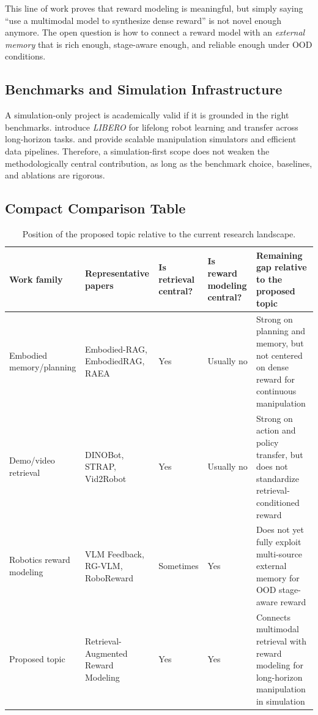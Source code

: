 This line of work proves that reward modeling is meaningful,
but simply saying ``use a multimodal model to synthesize dense reward'' is not novel enough anymore.
The open question is how to connect a reward model with an \textit{external memory}
that is rich enough, stage-aware enough, and reliable enough under OOD conditions.

\subsection{Benchmarks and Simulation Infrastructure}

A simulation-only project is academically valid if it is grounded in the right benchmarks.
\citet{liu2023libero} introduce \textit{LIBERO} for lifelong robot learning and transfer across long-horizon tasks.
\citet{gu2022maniskill2} and \citet{tao2024maniskill3} provide scalable manipulation simulators and efficient data pipelines.
Therefore, a simulation-first scope does not weaken the methodologically central contribution,
as long as the benchmark choice, baselines, and ablations are rigorous.

\subsection{Compact Comparison Table}

\begin{table}[htbp]
  \centering
  \small
  \begin{tabularx}{\textwidth}{p{2.4cm}p{2.7cm}Y Y Y}
    \toprule
    Work family & Representative papers & Is retrieval central? & Is reward modeling central? & Remaining gap relative to the proposed topic \\
    \midrule
    Embodied memory/planning & Embodied-RAG, EmbodiedRAG, RAEA & Yes & Usually no & Strong on planning and memory, but not centered on dense reward for continuous manipulation \\
    Demo/video retrieval & DINOBot, STRAP, Vid2Robot & Yes & Usually no & Strong on action and policy transfer, but does not standardize retrieval-conditioned reward \\
    Robotics reward modeling & VLM Feedback, RG-VLM, RoboReward & Sometimes & Yes & Does not yet fully exploit multi-source external memory for OOD stage-aware reward \\
    Proposed topic & Retrieval-Augmented Reward Modeling & Yes & Yes & Connects multimodal retrieval with reward modeling for long-horizon manipulation in simulation \\
    \bottomrule
  \end{tabularx}
  \caption{Position of the proposed topic relative to the current research landscape.}
\end{table}

